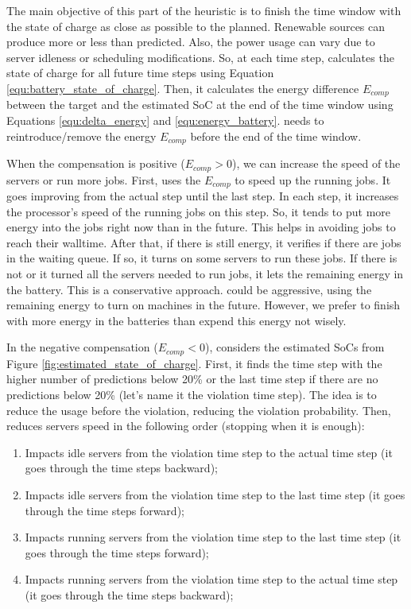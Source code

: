 The main objective of this part of the heuristic is to finish the time window with the state of charge as close as possible to the planned. Renewable sources can produce more or less than predicted. Also, the power usage can vary due to server idleness or scheduling modifications. So, at each time step, \emph{\systemName} calculates the state of charge for all future time steps using Equation \ref{equ:battery_state_of_charge}. Then, it calculates the energy difference $E_{comp}$ between the target and the estimated SoC at the end of the time window using Equations \ref{equ:delta_energy} and \ref{equ:energy_battery}. \emph{\systemName} needs to reintroduce/remove the energy $E_{comp}$ before the end of the time window.

When the compensation is positive ($E_{comp}>0$), we can increase the speed of the servers or run more jobs. First, \emph{\systemName} uses the $E_{comp}$ to speed up the running jobs. It goes improving from the actual step until the last step. In each step, it increases the processor's speed of the running jobs on this step. So, it tends to put more energy into the jobs right now than in the future. This helps in avoiding jobs to reach their walltime. After that, if there is still energy, it verifies if there are jobs in the waiting queue. If so, it turns on some servers to run these jobs. If there is not or it turned all the servers needed to run jobs, it lets the remaining energy in the battery. This is a conservative approach. \emph{\systemName} could be aggressive, using the remaining energy to turn on machines in the future. However, we prefer to finish with more energy in the batteries than expend this energy not wisely.

In the negative compensation ($E_{comp}<0$), \emph{\systemName} considers the estimated SoCs from Figure \ref{fig:estimated_state_of_charge}. First, it finds the time step with the higher number of predictions below 20\% or the last time step if there are no predictions below 20\% (let's name it the violation time step). The idea is to reduce the usage before the violation, reducing the violation probability. Then, \emph{\systemName} reduces servers speed in the following order (stopping when it is enough):
\begin{enumerate}
    \item Impacts idle servers from the violation time step to the actual time step (it goes through the time steps backward);
    \item Impacts idle servers from the violation time step to the last time step (it goes through the time steps forward);
    \item Impacts running servers from the violation time step to the last time step (it goes through the time steps forward);
    \item Impacts running servers from the violation time step to the actual time step (it goes through the time steps backward);
\end{enumerate}


